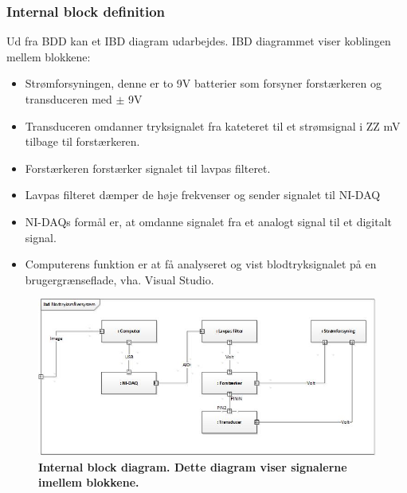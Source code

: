 \subsubsection{Internal block definition}
Ud fra BDD kan et IBD diagram udarbejdes. IBD diagrammet viser koblingen mellem blokkene:
\begin{itemize}
\item Strømforsyningen, denne er to 9V batterier som forsyner forstærkeren og transduceren med $\pm$ 9V
\item Transduceren omdanner tryksignalet fra kateteret til et strømsignal i ZZ mV tilbage til forstærkeren.
\item Forstærkeren forstærker signalet til lavpas filteret.
\item Lavpas filteret dæmper de høje frekvenser og sender signalet til NI-DAQ
\item NI-DAQs formål er, at omdanne signalet fra et analogt signal til et digitalt signal.
\item Computerens funktion er at få analyseret og vist blodtryksignalet på en brugergrænseflade, vha. Visual Studio. 
\end{itemize}
\begin{figure}[H]
\includegraphics[width =1.0\textwidth , center]{billeder/IBD}
\caption{\textbf{Internal block diagram. Dette diagram viser signalerne imellem blokkene.}}
\end{figure}
